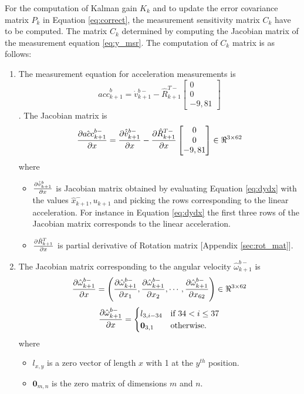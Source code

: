For the computation of Kalman gain $K_k$ and to update the error covariance matrix $P_k$ in Equation \ref{eq:correct}, the measurement sensitivity matrix $C_k$ have to be computed. The matrix $C_k$ determined by computing the Jacobian matrix of the measurement equation \ref{eq:y_msr}. The computation of $C_k$ matrix is as follows:
\begin{enumerate}
\item The measurement equation for acceleration measurements is  $$\hat{acc}^b_{k+1} = \dot{v}^{b-}_{k+1}-\hat{R}_{k+1}^{T-}\begin{bmatrix} 0 \\ 0 \\ -9,81 \end{bmatrix}$$.
The Jacobian matrix is 
\begin{equation}
    \label{eq:dacc_msrdx}
    \frac{\partial {\hat{acc}_{k+1}^{b-}}}{\partial {x}} = \frac{\partial {\hat{\dot{v}}_{k+1}^{b-}}}{\partial {x}} - \frac{\partial {\hat{R}^{T-}_{k+1}}}{\partial {x}}\begin{bmatrix} 0 \\ 0 \\ -9,81 \end{bmatrix}  \in \Re^{3 \times 62}
\end{equation}where
\begin{itemize}
    \item $\frac{\partial {\hat{\dot{v}}_{k+1}^b}}{\partial {x}}$ is Jacobian matrix obtained by evaluating Equation \ref{eq:dydx} with the values $\hat x_{k+1}^-, u_{k+1}$ and picking the rows corresponding to the linear acceleration. For instance in Equation \ref{eq:dydx} the first three rows of the Jacobian matrix corresponds to the linear acceleration.
    \item $\frac{\partial {\hat{R}^T_{k+1}}}{\partial {x}}$ is partial derivative of Rotation matrix [Appendix \ref{sec:rot_mat}].
\end{itemize}

\item The Jacobian matrix corresponding to the angular velocity $\hat{\omega}^{b-}_{k+1}$ is 
\begin{equation}
    \label{eq:dw_msrdx} 
    \frac{\partial {\hat{\omega}^{b-}_{k+1}}}{\partial {x}} = \left(\frac{\partial {\hat{\omega}^{b-}_{k+1}}}{\partial {x_{1}}}, \frac{\partial {\hat{\omega}^{b-}_{k+1}}}{\partial {x_{2}}}, \cdots , \frac{\partial {\hat{\omega}^{b-}_{k+1}}}{\partial {x_{62}}}\right) \in \Re^{3 \times 62}
\end{equation}
\[ \frac{\partial {\hat{\omega}^{b-}_{k+1}}}{\partial {x}} = 
    \begin{cases}
    l_{3,i-34} & \text{if } 34 < i \leq 37 \\
    \textbf{0}_{3,1} &\text{otherwise}.
    \end{cases}
 \]where 
 \begin{itemize}  
 \item $l_{x,y}$ is a zero vector of length $x$ with 1 at the $y^{th}$ position.
 \item $\textbf{0}_{m,n}$ is the zero matrix of dimensions $m$ and $n$.
 \end{itemize}


\end{enumerate}
